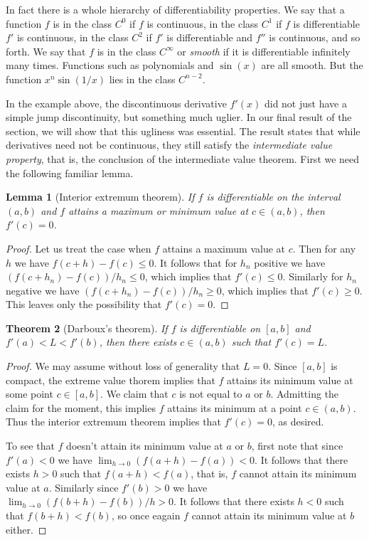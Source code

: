 \documentclass[11pt,oneside]{amsbook}
\theoremstyle{definition}
\theoremstyle{plain}
\newtheorem{thm}{Theorem}[section]
\newtheorem{lem}[thm]{Lemma}
\theoremstyle{definition}
\theoremstyle{remark}
\numberwithin{equation}{section}
\numberwithin{figure}{section}
\begin{document}
In fact there is a whole hierarchy of differentiability properties. We say that a function $f$ is in the class $C^0$ if $f$ is continuous, in the class $C^1$ if $f$ is differentiable $f'$ is continuous, in the class $C^2$ if $f'$ is differentiable and $f''$ is continuous, and so forth. We say that $f$ is in the class $C^\infty$ or \emph{smooth} if it is differentiable infinitely many times. Functions such as polynomials and $\sin(x)$ are all smooth. But the function $x^n\sin(1/x)$ lies in the class $C^{n-2}$.

In the example above, the discontinuous derivative $f'(x)$ did not just have a simple jump discontinuity, but something much uglier. In our final result of the section, we will show that this ugliness was essential. The result states that while derivatives need not be continuous, they still satisfy the \emph{intermediate value property}, that is, the conclusion of the intermediate value theorem. First we need the following familiar lemma.

\begin{lem}[Interior extremum theorem]
  If $f$ is differentiable on the interval $(a,b)$ and $f$ attains a maximum or minimum value at $c\in(a,b)$, then $f'(c)=0$.
\end{lem}

\begin{proof}
  Let us treat the case when $f$ attains a maximum value at $c$. Then for any $h$ we have $f(c+h)-f(c)\leq0$. It follows that for $h_n$ positive we have $(f(c+h_n)-f(c))/h_n\leq0$, which implies that $f'(c)\leq0$. Similarly for $h_n$ negative we have $(f(c+h_n)-f(c))/h_n\geq0$, which implies that $f'(c)\geq0$. This leaves only the possibility that $f'(c)=0$.
\end{proof}

\begin{thm}[Darboux's theorem]
  If $f$ is differentiable on $[a,b]$ and $f'(a)<L<f'(b)$, then there exists $c\in(a,b)$ such that $f'(c)=L$.
\end{thm}

\begin{proof}
  We may assume without loss of generality that $L=0$. Since $[a,b]$ is compact, the extreme value thorem implies that $f$ attains its minimum value at some point $c\in[a,b]$. We claim that $c$ is not equal to $a$ or $b$. Admitting the claim for the moment, this implies $f$ attains its minimum at a point $c\in(a,b)$. Thus the interior extremum theorem implies that $f'(c)=0$, as desired.

  To see that $f$ doesn't attain its minimum value at $a$ or $b$, first note that since $f'(a)<0$ we have $\lim_{h\to0}(f(a+h)-f(a))<0$. It follows that there exists $h>0$ such that $f(a+h)<f(a)$, that is, $f$ cannot attain its minimum value at $a$. Similarly since $f'(b)>0$ we have $\lim_{h\to0}(f(b+h)-f(b))/h>0$. It follows that there exists $h<0$ such that $f(b+h)<f(b)$, so once eagain $f$ cannot attain its minimum value at $b$ either.
\end{proof}
\end{document}
